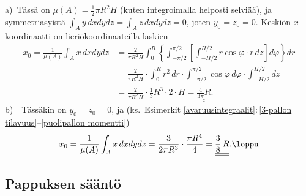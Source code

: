 \ratk a)\ Tässä on $\mu(A)=\frac{1}{2}\pi R^2H$ (kuten integroimalla helposti selviää), ja
symmetriasyistä $\int_A y\,dxdydz=\int_A z\,dxdydz=0$, joten $y_0=z_0=0$. Keskiön
$x$-koordinaatti on lieriökoordinaateilla laskien
\begin{align*}
x_0  = \frac{1}{\mu(A)}\int_A x\,dxdydz
    &= \frac{2}{\pi R^2H}\int_0^R\left\{\int_{-\pi/2}^{\pi/2}\left[\int_{-H/2}^{H/2}
         r\cos\varphi \cdot r\,dz\right]d\varphi\right\}dr \\
    &= \frac{2}{\pi R^2H}\cdot\int_0^R r^2\,dr\cdot\int_{-\pi/2}^{\pi/2}\cos\varphi\,d\varphi
                                             \cdot\int_{-H/2}^{H/2} dz \\
    &= \frac{2}{\pi R^2H} \cdot \frac{1}{3}R^3 \cdot 2 \cdot H
     =\underline{\underline{\frac{4}{3\pi}R}}.
\end{align*}
b)\ \, Tässäkin on $y_0=z_0=0$, ja
(ks.\ Esimerkit \ref{avaruusintegraalit}:\,\ref{3-pallon tilavuus}--\ref{puolipallon momentti})
\[
x_0=\frac{1}{\mu(A)}\int_A x\,dxdydz = \frac{3}{2\pi R^3}\cdot\frac{\pi R^4}{4} 
                                     = \underline{\underline{\frac{3}{8}\,R}}. \loppu
\]

\subsection*{Pappuksen sääntö}

